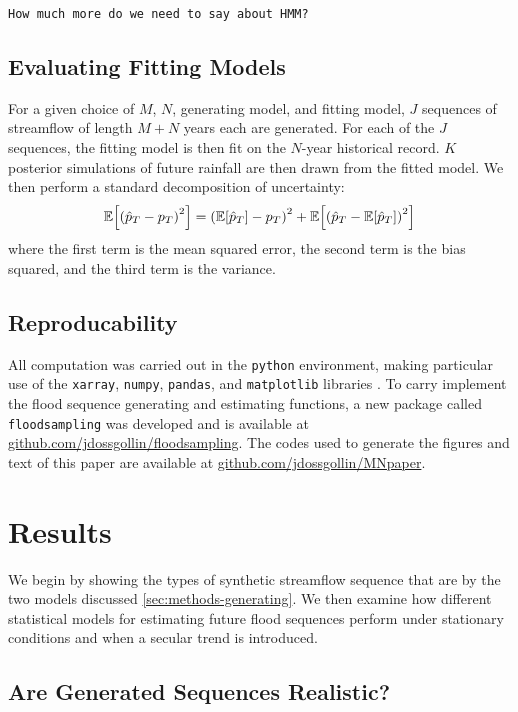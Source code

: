 \documentclass[11pt]{article}
\begin{document}
\texttt{How much more do we need to say about HMM?}

\subsection{Evaluating Fitting Models}

For a given choice of \(M\), \(N\), generating model, and fitting model, \(J\) sequences of streamflow of length \(M+N\) years each are generated.
For each of the \(J\) sequences, the fitting model is then fit on the \(N\)-year historical record.
\(K\) posterior simulations of future rainfall are then drawn from the fitted model.
We then perform a standard decomposition of uncertainty:
\begin{equation}
  \mathbb{E} \qty[ \qty( \hat{p}_T - p_T )^2 ] = \qty( \mathbb{E} \qty[ \hat{p}_T ] - p_T )^2 + \mathbb{E} \qty[ \qty( \hat{p}_T - \mathbb{E} \qty[ \hat{p}_T ] )^2]
\end{equation}
where the first term is the mean squared error, the second term is the bias squared, and the third term is the variance.

\subsection{Reproducability}

All computation was carried out in the \texttt{python} environment, making particular use of the \texttt{xarray}, \texttt{numpy}, \texttt{pandas}, and \texttt{matplotlib} libraries \citep{Hoyer2017,vanderWalt2011,McKinney2010,Hunter2007}.
To carry implement the flood sequence generating and estimating functions, a new package called \texttt{floodsampling} was developed and is available at \url{github.com/jdossgollin/floodsampling}.
The codes used to generate the figures and text of this paper are available at \url{github.com/jdossgollin/MNpaper}.

\section{Results}

We begin by showing the types of synthetic streamflow sequence that are by the two models discussed \cref{sec:methods-generating}.
We then examine how different statistical models for estimating future flood sequences perform under stationary conditions and when a secular trend is introduced.

\subsection{Are Generated Sequences Realistic?\label{sec:sequence-realistic}}
\end{document}
